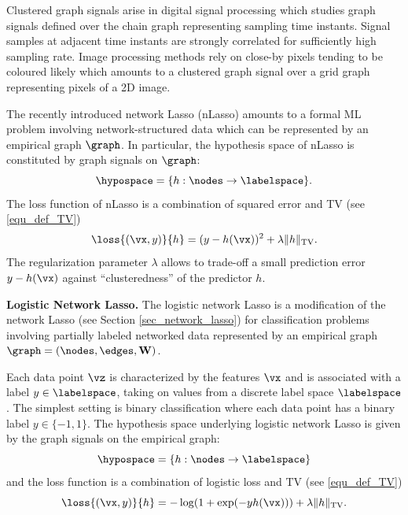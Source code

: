 \documentclass[12pt]{report}
\begin{document}
Clustered graph signals arise in digital signal processing which studies graph signals 
defined over the chain graph representing sampling time instants. Signal samples 
at adjacent time instants are strongly correlated for sufficiently high sampling rate. 
Image processing methods rely on close-by pixels tending to be coloured likely 
which amounts to a clustered graph signal over a grid graph representing pixels 
of a 2D image.  

The recently introduced network Lasso (nLasso) amounts to a formal ML problem involving 
network-structured data which can be represented by an empirical graph $\graph$. In particular, 
the hypothesis space of nLasso is constituted by graph signals on $\graph$: 
\begin{equation}
\hypospace  = \{ h: \nodes \rightarrow \labelspace \}.
\end{equation} 
The loss function of nLasso is a combination of squared error and TV (see \eqref{equ_def_TV}) 
\begin{equation}
\loss{(\vx,y)}{h} = (y - h(\vx))^{2} + \lambda \| h  \|_{\rm TV}. 
\end{equation} 
The regularization parameter $\lambda$ allows to trade-off a small prediction error $y-h(\vx)$ 
against ``clusteredness'' of the predictor $h$. 


{\bf Logistic Network Lasso.} The logistic network Lasso \cite{LogisticNLassoAsilomar2018,LogisticNLasso} 
is a modification of the network Lasso (see Section \ref{sec_network_lasso}) for classification problems 
involving partially labeled networked data represented by an empirical graph $\graph=(\nodes,\edges,\mathbf{W})$. 

Each data point $\vz$ is characterized by the features $\vx$ and is associated with a label $y \in \labelspace$, 
taking on values from a discrete label space $\labelspace$. The simplest setting is binary classification where 
each data point has a binary label $y \in \{-1,1\}$. The hypothesis space underlying logistic network Lasso 
is given by the graph signals on the empirical graph: 
\begin{equation}
\hypospace  = \{ h: \nodes \rightarrow \labelspace \}
\end{equation} 
and the loss function is a combination of logistic loss and TV (see \eqref{equ_def_TV})
\begin{equation}
\loss{(\vx,y)}{h} = -\log(1+ \exp(-yh(\vx))) + \lambda \| h  \|_{\rm TV}. 
\end{equation} 
\end{document}
